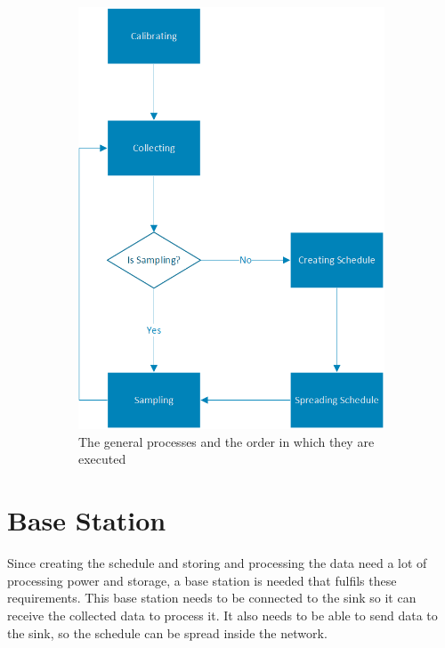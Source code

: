 \begin{figure}[htbp]
\begin{subfigure}[t]{0.4\textwidth}
        \includegraphics[scale=0.7]{content/images/GeneralAproachM}
        \caption{The general processes and the order in which they are executed}
        \label{fig:processes}
    \end{subfigure}
    \caption{}
\end{figure}

\section{Base Station}
Since creating the schedule and storing and processing the data need a lot of processing power and storage, a base station is needed that fulfils these requirements. This base station needs to be connected to the sink so it can receive the collected data to process it. It also needs to be able to send data to the sink, so the schedule can be spread inside the network.    
